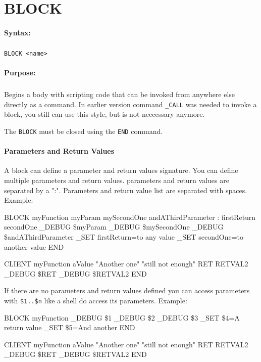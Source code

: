 
\newpage
\section{BLOCK}
\label{cmd:BLOCK}

\paragraph{Syntax:}
\subparagraph{}
\texttt{BLOCK <name>}

\paragraph{Purpose:}
\subparagraph{}
Begins a body with scripting code that can be invoked from anywhere 
else directly as a command. In earlier version command \texttt{_CALL} was
needed to invoke a block, you still can use this style, but is not 
neccessary anymore.

The \texttt{BLOCK} must be closed using the \texttt{END} command.

\paragraph{Parameters and Return Values}
A block can define a parameter and return values signature. You can define 
multiple parameters and return values. parameters and return values are 
separated by a ":". Parameters and return value list are separated with spaces.
Example:
\begin{usplisting}
    BLOCK myFunction myParam mySecondOne andAThirdParameter : firstReturn secondOne
      _DEBUG \$myParam
      _DEBUG \$mySecondOne
      _DEBUG \$andAThirdParameter
      _SET firstReturn=to any value
      _SET secondOne=to another value
    END 

    CLIENT
      myFunction aValue "Another one" "still not enough" RET RETVAL2
      _DEBUG \$RET
      _DEBUG \$RETVAL2
    END
\end{usplisting}

If there are no parameters and return values defined you can access parameters
with \texttt{\$1..\$n} like a shell do access its parameters.
Example:
\begin{usplisting}
    BLOCK myFunction
      _DEBUG \$1
      _DEBUG \$2
      _DEBUG \$3
      _SET \$4=A return value
      _SET \$5=And another
    END

    CLIENT
      myFunction aValue "Another one" "still not enough" RET RETVAL2
      _DEBUG \$RET
      _DEBUG \$RETVAL2
    END
\end{usplisting}

